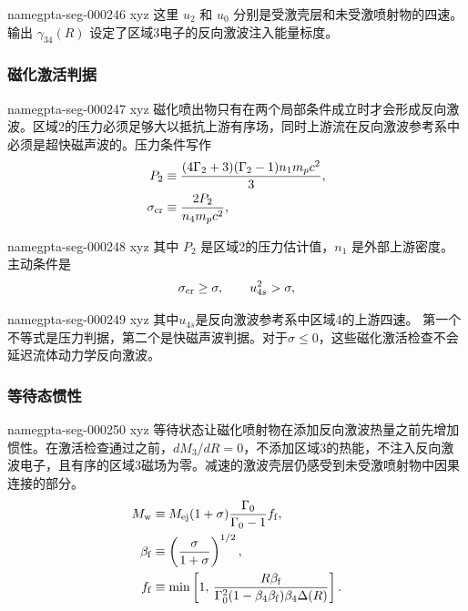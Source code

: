 \documentclass[twocolumn]{aastex702}
\makeatletter
\providecommand{\gptareaderanchor}[1]{\pdfdest name{#1} xyz}%
\providecommand{\gptareaderanchor}[1]{\special{pdf:dest (#1) [ @thispage /XYZ @xpos @ypos null ]}}%
\makeatother
\begin{document}
\gptareaderanchor{gpta-seg-000246}%
这里 \(u_2\) 和 \(u_0\) 分别是受激壳层和未受激喷射物的四速。输出 \(\gamma_{34}(R)\) 设定了区域3电子的反向激波注入能量标度。

\subsubsection{磁化激活判据}


\gptareaderanchor{gpta-seg-000247}%
磁化喷出物只有在两个局部条件成立时才会形成反向激波。区域2的压力必须足够大以抵抗上游有序场，同时上游流在反向激波参考系中必须是超快磁声波的。压力条件写作
\begin{equation}
\begin{aligned}
P_2&\equiv
\frac{(4\Gamma_2+3)(\Gamma_2-1)n_1m_pc^2}{3},\\
\sigma_{\rm cr}&\equiv \frac{2P_2}{n_4m_pc^2},
\end{aligned}
\end{equation}

\gptareaderanchor{gpta-seg-000248}%
其中 \(P_2\) 是区域2的压力估计值，\(n_1\) 是外部上游密度。主动条件是
\begin{equation}
\sigma_{\rm cr}\ge\sigma,\qquad u_{4s}^2>\sigma ,
\end{equation}

\gptareaderanchor{gpta-seg-000249}%
其中\(u_{4s}\)是反向激波参考系中区域4的上游四速。
第一个不等式是压力判据，第二个是快磁声波判据。对于\(\sigma\le0\)，这些磁化激活检查不会延迟流体动力学反向激波。

\subsubsection{等待态惯性}


\gptareaderanchor{gpta-seg-000250}%
等待状态让磁化喷射物在添加反向激波热量之前先增加惯性。在激活检查通过之前，\(dM_3/dR=0\)，不添加区域3的热能，不注入反向激波电子，且有序的区域3磁场为零。减速的激波壳层仍感受到未受激喷射物中因果连接的部分。
\begin{equation}
\begin{aligned}
M_{\rm w}&\equiv
M_{\rm ej}(1+\sigma)\frac{\Gamma_0}{\Gamma_0-1}f_{\rm f},\\
\beta_{\rm f}&\equiv \left(\frac{\sigma}{1+\sigma}\right)^{1/2},\\
f_{\rm f}&\equiv \min\left[
1,\,
\frac{R\beta_{\rm f}}
{\Gamma_0^2(1-\beta_4\beta_{\rm f})\beta_4\Delta(R)}
\right].
\end{aligned}
\end{equation}
\end{document}
